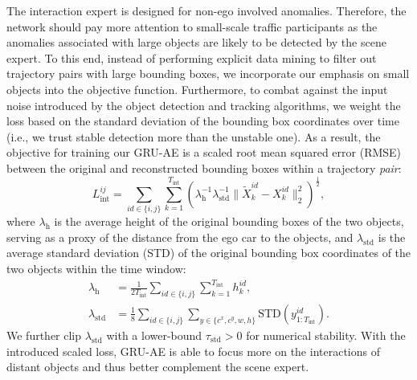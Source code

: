 The interaction expert is designed for non-ego involved anomalies. Therefore, the network should pay more attention to small-scale traffic participants as the anomalies associated with large objects are likely to be detected by the scene expert. To this end, instead of performing explicit data mining to filter out trajectory pairs with large bounding boxes, we incorporate our emphasis on small objects into the objective function. Furthermore, to combat against the input noise introduced by the object detection and tracking algorithms, we weight the loss based on the standard deviation of the bounding box coordinates over time (i.e., we trust stable detection more than the unstable one). As a result, the objective for training our GRU-AE is a scaled root mean squared error (RMSE) between the original and reconstructed bounding boxes within a trajectory \textit{pair}:
\begin{equation}
\label{eq:im-loss}
L_\text{int}^{ij} = \sum_{id \in \{i,j\}} \sum_{k=1}^{T_\text{int}} \left( \lambda_\text{h}^{-1} \lambda_\text{std}^{-1} \| \tilde{X}_k^{id} - X_k^{id} \|_2^2 \right)^\frac{1}{2},
\end{equation}
where $\lambda_\text{h}$ is the average height of the original bounding boxes of the two objects, serving as a proxy of the distance from the ego car to the objects, and $\lambda_\text{std}$ is the average standard deviation (STD) of the original bounding box coordinates of the two objects within the time window:
\begin{equation}
\begin{aligned}
\lambda_\text{h} &= \frac{1}{2T_\text{int}} \sum_{id \in \{i,j\}} \sum_{k=1}^{T_\text{int}} h_k^{id}, \\
\lambda_\text{std} &= \frac{1}{8} \sum_{id \in \{i,j\}} \sum_{y \in \{c^x,c^y,w,h\}} \text{STD} (y_{1:T_\text{int}}^{id}).
\end{aligned}
\end{equation}
We further clip $\lambda_\text{std}$ with a lower-bound $\tau_\text{std} > 0$ for numerical stability. With the introduced scaled loss, GRU-AE is able to focus more on the interactions of distant objects and thus better complement the scene expert.

